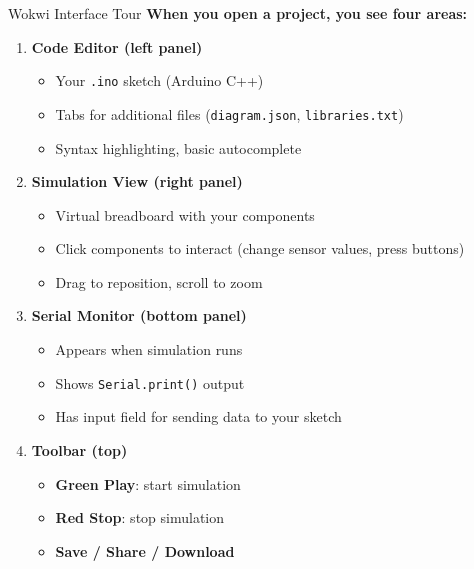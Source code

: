\documentclass[aspectratio=169,11pt]{beamer}
\begin{document}
\begin{frame}{Wokwi Interface Tour}
    \textbf{When you open a project, you see four areas:}

    \vspace{0.2cm}
    \begin{enumerate}
        \item \textbf{Code Editor (left panel)}
        \begin{itemize}
            \item Your \texttt{.ino} sketch (Arduino C++)
            \item Tabs for additional files (\texttt{diagram.json}, \texttt{libraries.txt})
            \item Syntax highlighting, basic autocomplete
        \end{itemize}

        \item \textbf{Simulation View (right panel)}
        \begin{itemize}
            \item Virtual breadboard with your components
            \item Click components to interact (change sensor values, press buttons)
            \item Drag to reposition, scroll to zoom
        \end{itemize}

        \item \textbf{Serial Monitor (bottom panel)}
        \begin{itemize}
            \item Appears when simulation runs
            \item Shows \texttt{Serial.print()} output
            \item Has input field for sending data to your sketch
        \end{itemize}

        \item \textbf{Toolbar (top)}
        \begin{itemize}
            \item \textbf{Green Play}: start simulation
            \item \textbf{Red Stop}: stop simulation
            \item \textbf{Save / Share / Download}
        \end{itemize}
    \end{enumerate}
\end{frame}
\end{document}
